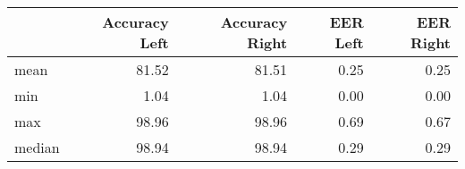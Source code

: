 \begin{tabular}{lrrrr}
\toprule
{} &  Accuracy Left &  Accuracy Right &  EER Left &  EER Right \\
\midrule
mean   &          81.52 &           81.51 &      0.25 &       0.25 \\
min    &           1.04 &            1.04 &      0.00 &       0.00 \\
max    &          98.96 &           98.96 &      0.69 &       0.67 \\
median &          98.94 &           98.94 &      0.29 &       0.29 \\
\bottomrule
\end{tabular}
